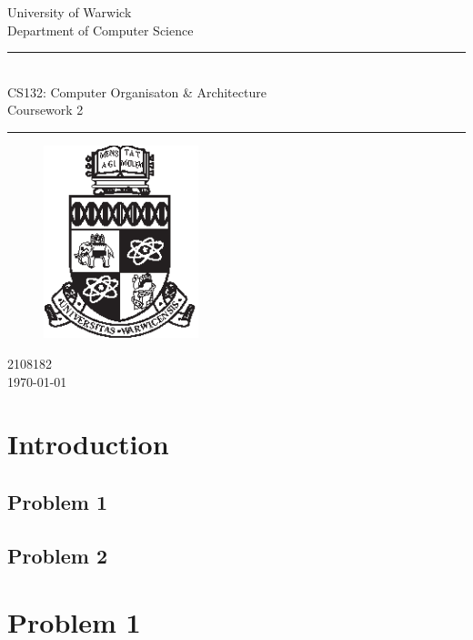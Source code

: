 \documentclass[a4paper]{article}
\theoremstyle{plain}
\theoremstyle{definition}
\theoremstyle{remark}
\begin{document}
	\begin{titlepage}
	\begin{center}
	\large
	University of Warwick \\
	Department of Computer Science \\
	\huge
	\vspace{50mm}
	\rule{\linewidth}{0.5pt} \\
	CS132: Computer Organisaton \& Architecture \\
	\vspace{5mm}
	\Large
	Coursework 2
	\rule{\linewidth}{0.5pt}
	\vspace{5mm}
	\begin{figure}[H]
	\centering
	\includegraphics[width=0.4\textwidth]{crest_black.eps}
	\end{figure}
	\vspace{33mm}
	2108182\\
	\today
	\end{center}
	\end{titlepage}
\tableofcontents
\newpage
\section{Introduction}
\subsection{Problem 1}

\subsection{Problem 2}
\section{Problem 1}
\end{document}

